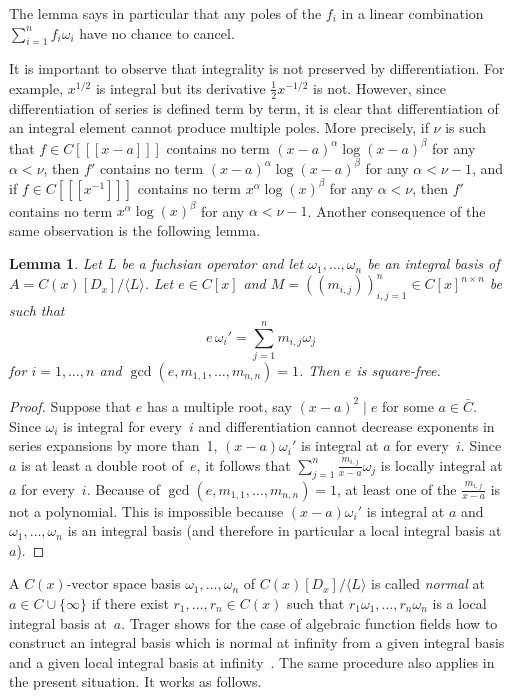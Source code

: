 \documentclass{sig-alternate}
\newtheorem{lemma}[theorem]{Lemma}
\def\<#1>{\langle#1\rangle}
\begin{document}
The lemma says in particular that any poles of the $f_i$ in a linear combination
$\sum_{i=1}^n f_i\omega_i$ have no chance to cancel.

It is important to observe that integrality is not preserved by differentiation.
For example, $x^{1/2}$ is integral but its derivative $\tfrac12 x^{-1/2}$ is
not. However, since differentiation of series is defined term by term, it is
clear that differentiation of an integral element cannot produce multiple
poles. More precisely, if $\nu$ is such that $f\in C[[[x-a]]]$ contains no term
$(x-a)^\alpha\log(x-a)^\beta$ for any $\alpha<\nu$, then $f'$ contains no term
$(x-a)^\alpha\log(x-a)^\beta$ for any $\alpha<\nu-1$, and if $f\in
C[[[x^{-1}]]]$ contains no term $x^\alpha\log(x)^\beta$ for any $\alpha<\nu$,
then $f'$ contains no term $x^\alpha\log(x)^\beta$ for any
$\alpha<\nu-1$. Another consequence of the same observation is the following
lemma.

\begin{lemma}
  Let $L$ be a fuchsian operator and let
  $\omega_1,\dots,\omega_n$ be an integral basis of $A=C(x)[D_x]/\<L>$.
  Let $e\in C[x]$ and
  $M=((m_{i,j}))_{i,j=1}^n\in C[x]^{n\times n}$ be such that
  \[
    e\,\omega_i'=\sum_{j=1}^n m_{i,j}\omega_j
  \]
  for $i=1,\dots,n$ and $\gcd(e,m_{1,1},\dots,m_{n,n})=1$.
  Then $e$ is square-free.
\end{lemma}
\begin{proof}
  Suppose that $e$ has a multiple root, say $(x-a)^2\mid e$ for some $a\in\bar
  C$. Since $\omega_i$ is integral for every~$i$ and differentiation cannot
  decrease exponents in series expansions by more than~1, $(x-a)\omega_i'$ is
  integral at $a$ for every~$i$.  Since $a$ is at least a double root of~$e$, it
  follows that $\sum_{j=1}^n\frac{m_{i,j}}{x-a}\omega_j$ is locally integral
  at~$a$ for every~$i$.  Because of $\gcd(e,m_{1,1},\dots,m_{n,n})=1$, at least
  one of the $\frac{m_{i,j}}{x-a}$ is not a polynomial.  This is impossible
  because $(x-a)\omega_i'$ is integral at $a$ and $\omega_1,\dots,\omega_n$ is
  an integral basis (and therefore in particular a local integral basis at~$a$).
\end{proof}

A $C(x)$-vector space basis $\omega_1,\dots,\omega_n$ of $C(x)[D_x]/\<L>$ is
called \emph{normal} at $a\in C\cup\{\infty\}$ if there exist $r_1,\dots,r_n\in
C(x)$ such that $r_1\omega_1,\dots,r_n\omega_n$ is a local integral basis
at~$a$. Trager shows for the case of algebraic function fields how to construct
an integral basis which is normal at infinity from a given integral basis and
a given local integral basis at infinity~\cite{..}. The same procedure also applies
in the present situation. It works as follows.
\end{document}
